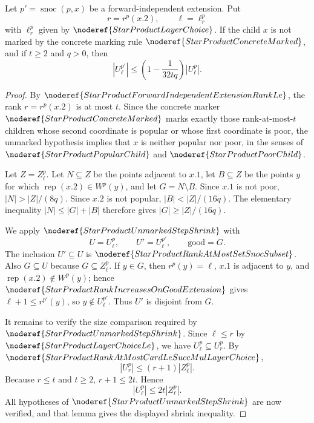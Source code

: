 \begin{lemma}
Let \(p'=\operatorname{snoc}(p,x)\) be a forward-independent extension.  Put
\[
  r=r^p(x.2),\qquad \ell=\ell_r^p
\]
with \(\ell_r^p\) given by \(\noderef{StarProductLayerChoice}\).  If the child
\(x\) is not marked by the concrete marking rule
\(\noderef{StarProductConcreteMarked}\), and if \(t\ge2\) and \(q>0\), then
\[
  |U_\ell^{p'}|
  \le
  \left(1-\frac{1}{32tq}\right)|U_\ell^p|.
\]
\end{lemma}
\begin{proof}
By \(\noderef{StarProductForwardIndependentExtensionRankLe}\), the rank
\(r=r^p(x.2)\) is at most \(t\).  Since the concrete marker
\(\noderef{StarProductConcreteMarked}\) marks exactly those rank-at-most-\(t\)
children whose second coordinate is popular or whose first coordinate is poor,
the unmarked hypothesis implies that \(x\) is neither popular nor poor, in the
senses of \(\noderef{StarProductPopularChild}\) and
\(\noderef{StarProductPoorChild}\).

Let \(Z=Z_\ell^p\).  Let \(N\subseteq Z\) be the points adjacent to \(x.1\),
let \(B\subseteq Z\) be the points \(y\) for which
\(\operatorname{rep}(x.2)\in W^p(y)\), and let \(G=N\setminus B\).  Since
\(x.1\) is not poor, \(|N|>|Z|/(8q)\).  Since \(x.2\) is not popular,
\(|B|<|Z|/(16q)\).  The elementary inequality
\(|N|\le |G|+|B|\) therefore gives \(|G|\ge |Z|/(16q)\).

We apply \(\noderef{StarProductUnmarkedStepShrink}\) with
\[
  U=U_\ell^p,\qquad U'=U_\ell^{p'},\qquad \text{good}=G.
\]
The inclusion \(U'\subseteq U\) is
\(\noderef{StarProductRankAtMostSetSnocSubset}\).  Also \(G\subseteq U\)
because \(G\subseteq Z_\ell^p\).  If \(y\in G\), then \(r^p(y)=\ell\), \(x.1\)
is adjacent to \(y\), and \(\operatorname{rep}(x.2)\notin W^p(y)\); hence
\(\noderef{StarProductRankIncreasesOnGoodExtension}\) gives
\(\ell+1\le r^{p'}(y)\), so \(y\notin U_\ell^{p'}\).  Thus \(U'\) is disjoint
from \(G\).

It remains to verify the size comparison required by
\(\noderef{StarProductUnmarkedStepShrink}\).  Since
\(\ell\le r\) by \(\noderef{StarProductLayerChoiceLe}\), we have
\(U_\ell^p\subseteq U_r^p\).  By
\(\noderef{StarProductRankAtMostCardLeSuccMulLayerChoice}\),
\[
  |U_r^p|\le (r+1)|Z_\ell^p|.
\]
Because \(r\le t\) and \(t\ge2\), \(r+1\le2t\).  Hence
\[
  |U_\ell^p|\le2t|Z_\ell^p|.
\]
All hypotheses of \(\noderef{StarProductUnmarkedStepShrink}\) are now
verified, and that lemma gives the displayed shrink inequality.
\end{proof}
